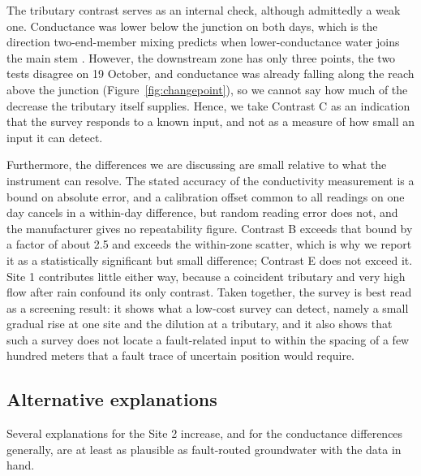 \documentclass{article}
\begin{document}
The tributary contrast serves as an internal check, although admittedly a weak one. Conductance was lower below the junction on both days, which is the direction two-end-member mixing predicts when lower-conductance water joins the main stem \citep{genereux1998}. However, the downstream zone has only three points, the two tests disagree on 19 October, and conductance was already falling along the reach above the junction (Figure~\ref{fig:changepoint}), so we cannot say how much of the decrease the tributary itself supplies. Hence, we take Contrast C as an indication that the survey responds to a known input, and not as a measure of how small an input it can detect.

Furthermore, the differences we are discussing are small relative to what the instrument can resolve. The stated accuracy of the conductivity measurement is a bound on absolute error, and a calibration offset common to all readings on one day cancels in a within-day difference, but random reading error does not, and the manufacturer gives no repeatability figure. Contrast B exceeds that bound by a factor of about 2.5 and exceeds the within-zone scatter, which is why we report it as a statistically significant but small difference; Contrast E does not exceed it. Site 1 contributes little either way, because a coincident tributary and very high flow after rain confound its only contrast. Taken together, the survey is best read as a screening result: it shows what a low-cost survey can detect, namely a small gradual rise at one site and the dilution at a tributary, and it also shows that such a survey does not locate a fault-related input to within the spacing of a few hundred meters that a fault trace of uncertain position would require.

\subsection{Alternative explanations}

Several explanations for the Site 2 increase, and for the conductance differences generally, are at least as plausible as fault-routed groundwater with the data in hand.
\end{document}
